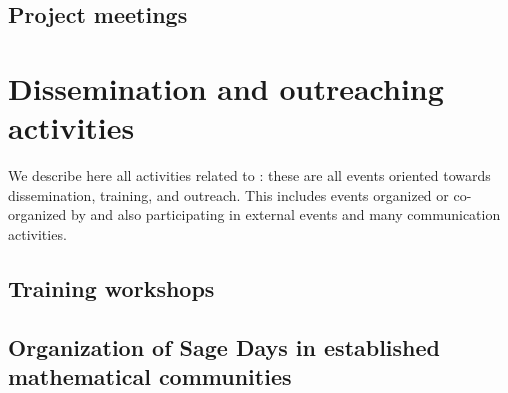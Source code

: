 \documentclass{deliverablereport}
\begin{document}









\subsection{Project meetings}





\section{Dissemination and outreaching activities}

We describe here all activities related to :
these are all events oriented towards dissemination, training, and outreach. This
includes events organized or co-organized by \ODK and also
participating in external events and many communication activities.

\subsection{Training workshops}





























\subsection{Organization of Sage Days in established mathematical communities}
\end{document}
